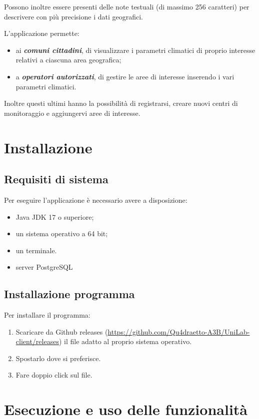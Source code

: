 Possono inoltre essere presenti delle note testuali (di massimo 256 caratteri) per descrivere con più precisione i dati geografici.

L'applicazione permette:
\begin{itemize}
	\item ai \textbf{\textsl{comuni cittadini}}, di visualizzare i parametri climatici di proprio interesse relativi a ciascuna area geografica;
	\item a \textbf{\textsl{operatori autorizzati}}, di gestire le aree di interesse inserendo i vari parametri climatici.
\end{itemize}
Inoltre questi ultimi hanno la possibilit\`a di registrarsi, creare nuovi centri di monitoraggio e aggiungervi aree di interesse.

\pagebreak

\chapter{Installazione}
\section{Requisiti di sistema}
Per eseguire l’applicazione \`e necessario avere a disposizione:
\begin{itemize}
	\item Java JDK 17 o superiore;
	\item un sistema operativo a 64 bit;
	\item un terminale.
	\item server PostgreSQL
\end{itemize}

\section{Installazione programma}

Per installare il programma:

\begin{enumerate}
	\item Scaricare da Github releases (\url{https://github.com/Qu4draetto-A3B/UniLab-client/releases}) il file adatto al proprio sistema operativo.
	\item Spostarlo dove si preferisce.
	\item Fare doppio click sul file.
\end{enumerate}

\chapter{Esecuzione e uso delle funzionalità}
